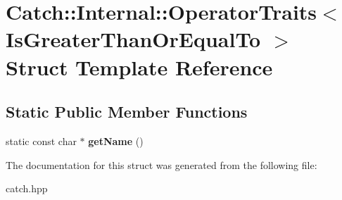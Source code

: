 \hypertarget{structCatch_1_1Internal_1_1OperatorTraits_3_01IsGreaterThanOrEqualTo_01_4}{}\section{Catch\+:\+:Internal\+:\+:Operator\+Traits$<$ Is\+Greater\+Than\+Or\+Equal\+To $>$ Struct Template Reference}
\label{structCatch_1_1Internal_1_1OperatorTraits_3_01IsGreaterThanOrEqualTo_01_4}
\subsection*{Static Public Member Functions}
\begin{DoxyCompactItemize}
\item 
\mbox{\label{structCatch_1_1Internal_1_1OperatorTraits_3_01IsGreaterThanOrEqualTo_01_4_a76b6f6b0dbaf7d19ebb1b4b4891e719e}} 
static const char $\ast$ {\bfseries get\+Name} ()
\end{DoxyCompactItemize}


The documentation for this struct was generated from the following file\+:\begin{DoxyCompactItemize}
\item 
catch.\+hpp\end{DoxyCompactItemize}
